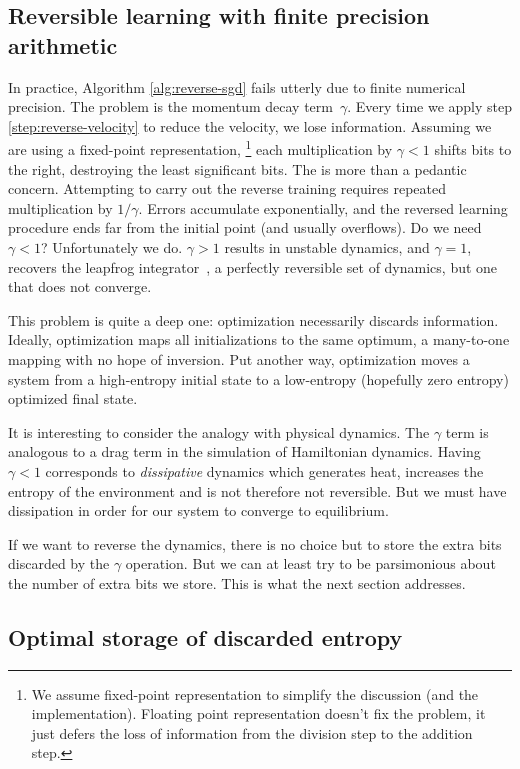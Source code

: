 \documentclass{article}
\newcommand{\decay}{\gamma}
\begin{document}
\subsection{Reversible learning with finite precision arithmetic}

In practice, Algorithm \ref{alg:reverse-sgd} fails utterly due to finite
numerical precision. The problem is the momentum decay term~$\decay$.
Every time we apply step \ref{step:reverse-velocity} to reduce the velocity, we
lose information. Assuming we are using a fixed-point representation,
\footnote{We assume fixed-point representation to simplify the discussion (and
  the implementation). Floating point representation doesn't fix the problem, it
  just defers the loss of information from the division step to the addition step.}
each multiplication by $\decay < 1$ shifts bits to the right, destroying the
least significant bits. The is more than a pedantic concern. Attempting to
carry out the reverse training requires repeated multiplication by $1/\decay$. 
Errors accumulate exponentially, and the reversed learning procedure ends far
from the initial point (and usually overflows). Do we need $\decay < 1$?
Unfortunately we do. $\decay > 1$ results in unstable dynamics, and
$\decay = 1$, recovers the leapfrog integrator~\citep{leapfrog1995}, a perfectly reversible set of dynamics, but one that does not converge.

This problem is quite a deep one: optimization necessarily discards information.
Ideally, optimization maps all initializations to the same optimum,
a many-to-one mapping with no hope of inversion.
Put another way, optimization moves a system from a high-entropy initial state
to a low-entropy (hopefully zero entropy) optimized final state.

It is interesting to consider the analogy with physical dynamics. The $\decay$
term is analogous to a drag term in the simulation of Hamiltonian dynamics.
Having $\decay < 1$ corresponds to \emph{dissipative} dynamics which generates
heat, increases the entropy of the environment and is not therefore not
reversible. But we must have dissipation in order for our system to converge to equilibrium.

If we want to reverse the dynamics, there is no choice but to store the extra
bits discarded by the $\decay$ operation. But we can at least try to
be parsimonious about the number of extra bits we store. This is what the next
section addresses.

\subsection{Optimal storage of discarded entropy}
\label{sec:reversible computation}
\end{document}

